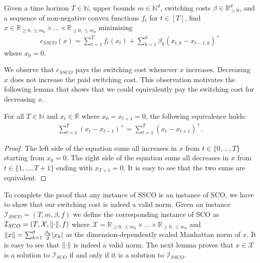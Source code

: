 \begin{problem}
Given a time horizon $T \in \mathbb{N}$, upper bounds $m \in \mathbb{N}^d$, switching costs $\beta \in \mathbb{R}_{>0}^d$, and a sequence of non-negative convex functions $f_t$ for $t \in [T]$, find $x \in \mathbb{R}_{\geq 0, \leq m_0} \times \dots \times \mathbb{R}_{\geq 0, \leq m_d}$ minimizing \begin{align*}
    c_{SSCO}(x) = \sum_{t=1}^T f_t(x_t) + \sum_{k=1}^d \beta_k (x_{t,k} - x_{t-1,k})^+
\end{align*}
where $x_0 = 0$.
\end{problem}

We observe that $c_{SSCO}$ pays the switching cost whenever $x$ increases. Decreasing $x$ does not increase the paid switching cost. This observation motivates the following lemma that shows that we could equivalently pay the switching cost for decreasing $x$.

\begin{lemma}
\label{lemma:inverse_switching_cost}
For all $T \in \mathbb{N}$ and $ x_t \in \mathbb{R}$ where $x_0 = x_{t+1} = 0$, the following equivalence holds:
\begin{align*}
    \sum_{t=1}^T (x_t - x_{t-1})^+ = \sum_{t=1}^T (x_t - x_{t+1})^+.
\end{align*}
\end{lemma}
\begin{proof}
The left side of the equation sums all increases in $x$ from $t \in \{0, \dots, T\}$ starting from $x_0 = 0$. The right side of the equation sums all decreases in $x$ from $t \in \{1, \dots, T+1\}$ ending with $x_{T+1} = 0$. It is easy to see that the two sums are equivalent.
\end{proof}

To complete the proof that any instance of SSCO is an instance of SCO, we have to show that our switching cost is indeed a valid norm. Given an instance $\mathcal{I}_{SSCO} = (T, m, \beta, f)$ we define the corresponding instance of SCO as $\mathcal{I}_{SCO} = (T, \mathcal{X}, \lVert\cdot\rVert, f)$ where $\mathcal{X} = \mathbb{R}_{\geq 0, \leq m_0} \times \dots \times \mathbb{R}_{\geq 0, \leq m_d}$ and $\lVert x\rVert = \sum_{k=1}^d \frac{\beta_k}{2} |x_k|$ as the dimension-dependently scaled Manhattan norm of $x$. It is easy to see that $\lVert\cdot\rVert$ is indeed a valid norm. The next lemma proves that $x \in \mathcal{X}$ is a solution to $\mathcal{I}_{SCO}$ if and only if it is a solution to $\mathcal{I}_{SSCO}$.

